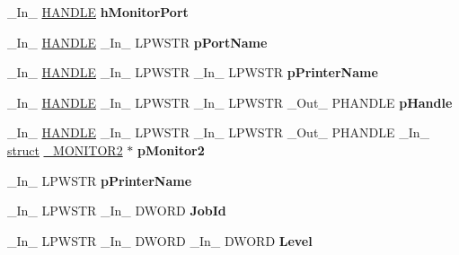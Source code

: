 \begin{DoxyCompactItemize}
\mbox{\label{struct___m_o_n_i_t_o_r2_ae020a577de3ec72fb45a4b6c018ca4ea}} 
\+\_\+\+In\+\_\+ \hyperlink{interfacevoid}{H\+A\+N\+D\+LE} {\bfseries h\+Monitor\+Port}
\item 
\mbox{\label{struct___m_o_n_i_t_o_r2_a6dc83b4220281a7ebcaa5958b841c186}} 
\+\_\+\+In\+\_\+ \hyperlink{interfacevoid}{H\+A\+N\+D\+LE} \+\_\+\+In\+\_\+ L\+P\+W\+S\+TR {\bfseries p\+Port\+Name}
\item 
\mbox{\label{struct___m_o_n_i_t_o_r2_a2f72a8fb46d9c2c5feebe2d672a5b89f}} 
\+\_\+\+In\+\_\+ \hyperlink{interfacevoid}{H\+A\+N\+D\+LE} \+\_\+\+In\+\_\+ L\+P\+W\+S\+TR \+\_\+\+In\+\_\+ L\+P\+W\+S\+TR {\bfseries p\+Printer\+Name}
\item 
\mbox{\label{struct___m_o_n_i_t_o_r2_a9240b8ddfcd62c394323c4ccb21988d3}} 
\+\_\+\+In\+\_\+ \hyperlink{interfacevoid}{H\+A\+N\+D\+LE} \+\_\+\+In\+\_\+ L\+P\+W\+S\+TR \+\_\+\+In\+\_\+ L\+P\+W\+S\+TR \+\_\+\+Out\+\_\+ P\+H\+A\+N\+D\+LE {\bfseries p\+Handle}
\item 
\mbox{\label{struct___m_o_n_i_t_o_r2_a5817e3ce647e13c32d292177e9c21ef7}} 
\+\_\+\+In\+\_\+ \hyperlink{interfacevoid}{H\+A\+N\+D\+LE} \+\_\+\+In\+\_\+ L\+P\+W\+S\+TR \+\_\+\+In\+\_\+ L\+P\+W\+S\+TR \+\_\+\+Out\+\_\+ P\+H\+A\+N\+D\+LE \+\_\+\+In\+\_\+ \hyperlink{interfacestruct}{struct} \hyperlink{struct___m_o_n_i_t_o_r2}{\+\_\+\+M\+O\+N\+I\+T\+O\+R2} $\ast$ {\bfseries p\+Monitor2}
\item 
\mbox{\label{struct___m_o_n_i_t_o_r2_a067468e70c85d3a7da168d1be3f9ffcb}} 
\+\_\+\+In\+\_\+ L\+P\+W\+S\+TR {\bfseries p\+Printer\+Name}
\item 
\mbox{\label{struct___m_o_n_i_t_o_r2_ada9201e7a70e4ff755a83f0b5449da8c}} 
\+\_\+\+In\+\_\+ L\+P\+W\+S\+TR \+\_\+\+In\+\_\+ D\+W\+O\+RD {\bfseries Job\+Id}
\item 
\mbox{\label{struct___m_o_n_i_t_o_r2_a7c145a10eff28a4f2f3542f41ec51f20}} 
\+\_\+\+In\+\_\+ L\+P\+W\+S\+TR \+\_\+\+In\+\_\+ D\+W\+O\+RD \+\_\+\+In\+\_\+ D\+W\+O\+RD {\bfseries Level}
\item 

\end{DoxyCompactItemize}
